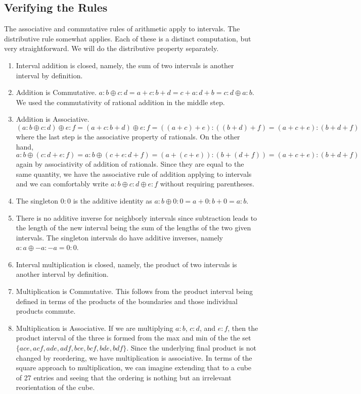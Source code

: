 \documentclass[12pt]{article}
\theoremstyle{remark}
\begin{document}
\subsection{Verifying the Rules}\label{sec:rules}

The associative and commutative rules of arithmetic apply to intervals. The distributive rule somewhat applies. Each of these is a distinct computation, but very straightforward. We will do the distributive property separately. 

\begin{enumerate}
    \item Interval addition is closed, namely, the sum of two intervals is another interval by definition. 
    \item Addition is Commutative. $a:b \oplus c:d= a+c : b+d = c+a:d+b = c:d \oplus a:b$. We used the commutativity of rational addition in the middle step. 
    \item Addition is Associative. $(a:b \oplus c:d) \oplus e:f = (a+c:b+d) \oplus e:f = ((a+c)+e):((b+d)+f) = (a+c+e):(b+d+f)$ where the last step is the associative property of rationals.  On the other hand, $a:b \oplus (c:d+e:f) = a:b \oplus (c+e:d+f) = (a+(c+e)):(b+(d+f)) = (a+c+e):(b+d+f)$ again by associativity of addition of rationals. Since they are equal to the same quantity, we have the associative rule of addition applying to intervals and we can comfortably write $a:b \oplus c:d \oplus e:f$ without requiring parentheses. 
    \item The singleton $0:0$ is the additive identity as $a:b \oplus 0:0 = a+0:b+0 = a:b$. 
    \item There is no additive inverse for neighborly intervals since subtraction leads to the length of the new interval being the sum of the lengths of the two given intervals. The singleton intervals do have additive inverses, namely $a:a \oplus -a:-a = 0:0$. 
    \item Interval multiplication is closed, namely, the product of two intervals is another interval by definition. 
    \item Multiplication is Commutative. This follows from the product interval being defined in terms of the products of the boundaries and those individual products commute. 
    \item Multiplication is Associative. If we are multiplying $a:b$, $c:d$, and $e:f$, then the product interval of the three is formed from the max and min of the the set $\{ace, acf, ade, adf, bce, bcf, bde, bdf\}$. Since the underlying final product is not changed by reordering, we have multiplication is associative. In terms of the square approach to multiplication, we can imagine extending that to a cube of 27 entries and seeing that the ordering is nothing but an irrelevant reorientation of the cube. 

\end{enumerate}
\end{document}
